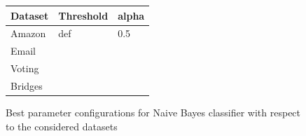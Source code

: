 \documentclass[11pt]{article}
\begin{document}
  
\begin{figure}[h]
\centering
  \begin{tabular}{ | l | l | l |}
	\hline
    Dataset & Threshold & alpha \\  
    \hline
    Amazon  & def & 0.5    \\  
    \hline
    Email   &  &  \\  
    \hline
    Voting &  &   \\
    \hline
    Bridges &  &  \\
	\hline
    \end{tabular}%
    \caption{Best parameter configurations for Naive Bayes classifier with respect to the considered datasets}
    \label{tab_conc1}
  \end{figure}

%
\newpage
 

\end{document}
